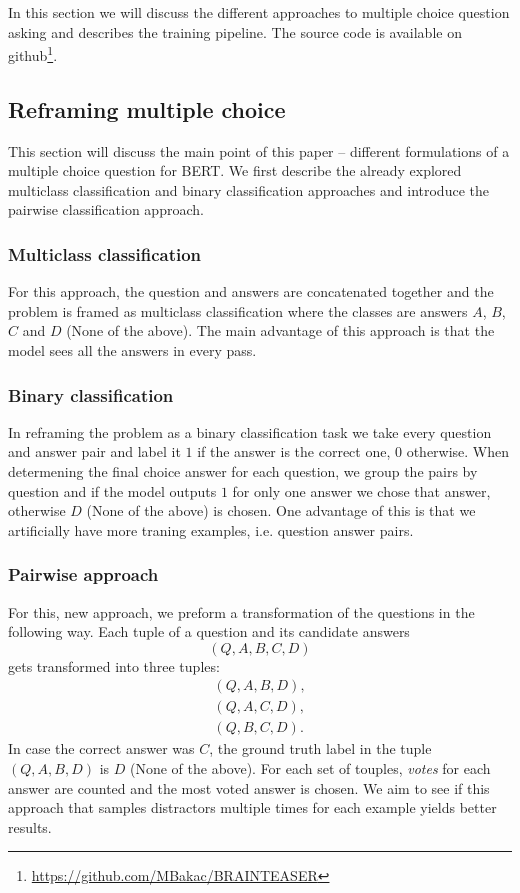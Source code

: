 In this section we will discuss the different approaches to multiple choice question asking and describes the training pipeline.
The source code is available on github\footnote[3]{\url{https://github.com/MBakac/BRAINTEASER}}.
\subsection{Reframing multiple choice}
This section will discuss the main point of this paper -- different formulations of a multiple choice question for BERT.
We first describe the already explored multiclass classification and binary classification approaches and introduce the pairwise classification approach.

\subsubsection{Multiclass classification}
For this approach, the question and answers are concatenated together and the problem is framed as multiclass classification where the classes are answers $A$, $B$, $C$ and $D$ (None of the above).
The main advantage of this approach is that the model sees all the answers in every pass.

\subsubsection{Binary classification}
In reframing the problem as a binary classification task we take every question and answer pair and label it $1$ if the answer is the correct one, $0$ otherwise.
When determening the final choice answer for each question, we group the pairs by question and if the model outputs $1$ for only one answer we chose that answer, otherwise $D$ (None of the above) is chosen.
One advantage of this is that we artificially have more traning examples, i.e. question answer pairs.

\subsubsection{Pairwise approach}
For this, new approach, we preform a transformation of the questions in the following way.
Each tuple of a question and its candidate answers
$$
    (Q,A,B,C,D)
$$
gets transformed into three tuples:
\begin{align*}
       (Q,A,B,D), \\
       (Q,A,C,D), \\
       (Q,B,C,D).
\end{align*}
In case the correct answer was $C$, the ground truth label in the tuple $(Q,A,B,D)$ is $D$ (None of the above).
For each set of touples, \emph{votes} for each answer are counted and the most voted answer is chosen.
We aim to see if this approach that samples distractors multiple times for each example yields better results.

